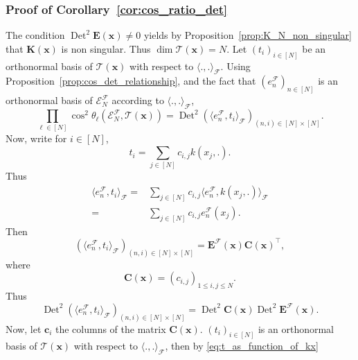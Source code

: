 \documentclass[twoside,11pt]{book}
\numberwithin{theorem}{chapter}
\numberwithin{definition}{chapter}
\numberwithin{proposition}{chapter}
\numberwithin{corollary}{chapter}
\numberwithin{example}{chapter}
\numberwithin{lemma}{chapter}
\DeclareMathOperator{\Det}{Det}
\DeclareMathOperator{\Tran}{\intercal}
\begin{document}
\subsubsection{Proof of Corollary~\ref{cor:cos_ratio_det}}

The condition $\Det^{2} \bm{E}(\bm{x}) \neq 0$ yields by Proposition~\ref{prop:K_N_non_singular} that $\bm{K}(\bm{x})$ is non singular. Thus $\dim \mathcal{T}(\bm{x}) = N$. Let $(t_{i})_{i \in [N]}$ be an orthonormal basis of $\mathcal{T}(\bm{x})$ with respect to $\langle ., . \rangle_{\mathcal{F}}$.
%
Using Proposition~\ref{prop:cos_det_relationship}, and the fact that $(e_{n}^{\mathcal{F}})_{n \in [N]}$ is an orthonormal basis of $\mathcal{E}^{\mathcal{F}}_{N}$ according to $\langle ., . \rangle_{\mathcal{F}}$,
\begin{equation}\label{eq:prod_cos_det_E}
\prod\limits_{\ell \in [N]} \cos^{2} \theta_{\ell} \left(\mathcal{E}^{\mathcal{F}}_{N}, \mathcal{T}(\bm{x}) \right) = \Det^{2} (\langle e_{n}^{\mathcal{F}}, t_{i} \rangle_{\mathcal{F}})_{(n,i) \in [N]\times[N]}.
\end{equation}
Now, write for $i \in [N]$,
\begin{equation}\label{eq:t_as_function_of_kx}
t_{i} = \sum\limits_{j \in [N]} c_{i,j} k(x_{j},.).
\end{equation}
%
Thus
\begin{align}
\langle e_{n}^{\mathcal{F}}, t_{i} \rangle_{\mathcal{F}} = & \sum\limits_{j \in [N]} c_{i,j} \langle e_{n}^{\mathcal{F}}, k(x_{j},.) \rangle_{\mathcal{F}} \\
= &\sum\limits_{j \in [N]} c_{i,j}  e_{n}^{\mathcal{F}}(x_{j}).
\end{align}
%
Then
\begin{equation}
(\langle e_{n}^{\mathcal{F}}, t_{i} \rangle_{\mathcal{F}})_{(n,i) \in [N]\times[N]} = \bm{E}^{\mathcal{F}}(\bm{x}) \bm{C}(\bm{x})^{\Tran} ,
\end{equation}
where
\begin{equation}
\bm{C}(\bm{x}) = (c_{i,j})_{1 \leq i,j \leq N}.
\end{equation}
%
Thus
\begin{equation}\label{eq:AN_times_EN}
\Det^{2} (\langle e_{n}^{\mathcal{F}}, t_{i} \rangle_{\mathcal{F}})_{(n,i) \in [N]\times[N]} = \Det^{2} \bm{C}(\bm{x}) \Det^{2} \bm{E}^{\mathcal{F}}(\bm{x}).
\end{equation}
Now, let $\bm{c}_{i}$ the columns of the matrix $\bm{C}(\bm{x})$. $(t_{i})_{i \in [N]}$ is an orthonormal basis of $\mathcal{T}(\bm{x})$ with respect to $\langle .,. \rangle_{\mathcal{F}}$, then by \eqref{eq:t_as_function_of_kx}
\end{document}
